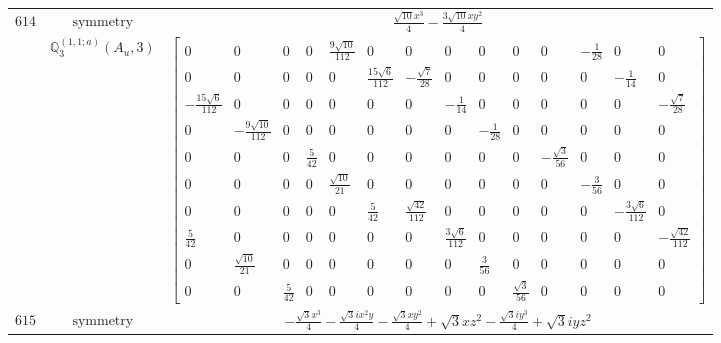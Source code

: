 \documentclass[fleqn,8pt,landscape]{jsarticle}
\begin{document}
\begin{longtable}{ccc}
$ 614 $ & $ \text{symmetry} $ & $ \frac{\sqrt{10} x^{3}}{4} - \frac{3 \sqrt{10} x y^{2}}{4} $ \\
$  $ & $ \mathbb{Q}_{3}^{(1,1;a)}(A_{u},3) $ & $ \begin{bmatrix} 0 & 0 & 0 & 0 & \frac{9 \sqrt{10}}{112} & 0 & 0 & 0 & 0 & 0 & 0 & - \frac{1}{28} & 0 & 0 \\ 0 & 0 & 0 & 0 & 0 & \frac{15 \sqrt{6}}{112} & - \frac{\sqrt{7}}{28} & 0 & 0 & 0 & 0 & 0 & - \frac{1}{14} & 0 \\ - \frac{15 \sqrt{6}}{112} & 0 & 0 & 0 & 0 & 0 & 0 & - \frac{1}{14} & 0 & 0 & 0 & 0 & 0 & - \frac{\sqrt{7}}{28} \\ 0 & - \frac{9 \sqrt{10}}{112} & 0 & 0 & 0 & 0 & 0 & 0 & - \frac{1}{28} & 0 & 0 & 0 & 0 & 0 \\ 0 & 0 & 0 & \frac{5}{42} & 0 & 0 & 0 & 0 & 0 & 0 & - \frac{\sqrt{3}}{56} & 0 & 0 & 0 \\ 0 & 0 & 0 & 0 & \frac{\sqrt{10}}{21} & 0 & 0 & 0 & 0 & 0 & 0 & - \frac{3}{56} & 0 & 0 \\ 0 & 0 & 0 & 0 & 0 & \frac{5}{42} & \frac{\sqrt{42}}{112} & 0 & 0 & 0 & 0 & 0 & - \frac{3 \sqrt{6}}{112} & 0 \\ \frac{5}{42} & 0 & 0 & 0 & 0 & 0 & 0 & \frac{3 \sqrt{6}}{112} & 0 & 0 & 0 & 0 & 0 & - \frac{\sqrt{42}}{112} \\ 0 & \frac{\sqrt{10}}{21} & 0 & 0 & 0 & 0 & 0 & 0 & \frac{3}{56} & 0 & 0 & 0 & 0 & 0 \\ 0 & 0 & \frac{5}{42} & 0 & 0 & 0 & 0 & 0 & 0 & \frac{\sqrt{3}}{56} & 0 & 0 & 0 & 0 \end{bmatrix} $ \\ \hline
$ 615 $ & $ \text{symmetry} $ & $ - \frac{\sqrt{3} x^{3}}{4} - \frac{\sqrt{3} i x^{2} y}{4} - \frac{\sqrt{3} x y^{2}}{4} + \sqrt{3} x z^{2} - \frac{\sqrt{3} i y^{3}}{4} + \sqrt{3} i y z^{2} $ \\

\end{longtable}
\end{document}
